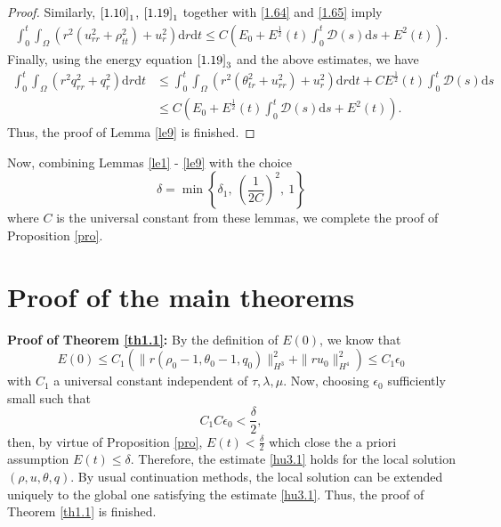 \documentclass[11pt,reqno]{amsart}
\numberwithin{equation}{section}
\newcommand{\dif}{\mathrm{d}}
\newcommand{\intx}{\int_0^t \int_{\Omega} }
\begin{document}
\begin{proof}
Similarly, $\eqref{1.10}_1$, $\eqref{1.19}_1$ together with \eqref{1.64} and \eqref{1.65} imply
\begin{align}\label{1.66}
\intx (r^2(u_{rr}^2+\rho_{tt}^2)+u_r^2) \dif r \dif t \le C(E_0+E^\frac{1}{2}(t) \int_0^t  \mathcal D(s)\dif s+E^2(t)).
\end{align}
Finally, using the energy equation $\eqref{1.19}_3$ and the above estimates, we have
\begin{align}
\intx (r^2 q_{rr}^2+q_r^2)\dif r\dif t &\le \intx (r^2(\theta_{tr}^2+u_{rr}^2)+u_r^2)\dif r\dif t+CE^\frac{1}{2}(t) \int_0^t  \mathcal D(s)\dif s \nonumber\\
&\le C(E_0+E^\frac{1}{2}(t) \int_0^t  \mathcal D(s)\dif s+E^2(t)).
\end{align}
Thus, the proof of Lemma \ref{le9} is finished.
\end{proof}
Now, combining Lemmas \ref{le1} - \ref{le9} with the choice
\[
\delta = \min \left\{ \delta_1,\  \left( \frac{1}{2C} \right)^{\!\!2},\  1 \right\}
\]
where \(C\) is the universal constant from these lemmas, we complete the proof of Proposition \ref{pro}.

\section{Proof of the main theorems}

\textbf{ Proof of Theorem \ref{th1.1}:}
By the definition of $E(0)$, we know that
\[
E(0)\le C_1\left( \|r(\rho_0-1, \theta_0-1, q_0)\|_{H^{3}}^2+\|ru_0\|_{H^4}^2\right)  \le C_1\epsilon_0
\]
with $C_1$ a universal constant independent of $\tau, \lambda, \mu$.
Now, choosing $\epsilon_0$ sufficiently small such that
\[
C_1 C \epsilon_0 <\frac{\delta}{2},
\]
then, by virtue of Proposition \ref{pro}, $E(t)<\frac{\delta}{2}$ which close the a priori assumption $E(t)\le \delta$. Therefore, the estimate \eqref{hu3.1} holds for the local solution $(\rho, u, \theta, q)$. By usual continuation methods, the local solution can be extended uniquely to the global one satisfying the estimate \eqref{hu3.1}. Thus, the proof of Theorem \ref{th1.1} is finished.
\end{document}
